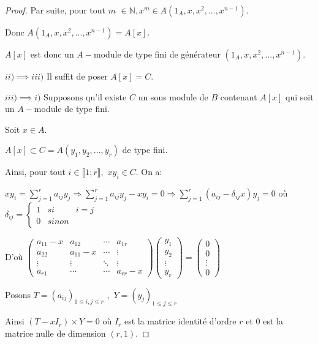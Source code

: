 \begin{proof}
	Par suite, pour tout $m$ $\in \mathbb{N},x^{m}\in A(1_A,x,x^{2},...,x^{n-1}).$
	
	Donc $A(1_A,x,x^{2},...,x^{n-1})=A[x]$.
	
	$A[x]$ est donc un $A-$module de type fini de générateur $
	(1_A,x,x^{2},...,x^{n-1}).$
	
	$ii)\implies iii)$ Il suffit de poser $A[x]=C$.
	
	$iii)\implies i)$ Supposons qu'il existe $C$ un sous module de $B$ contenant $A[x]$ qui soit un $A-$module de type fini.
	
	Soit $x\in A.$
	
	$A[x]\subset C=A(y_{1},y_{2},...,y_{r})$ de type fini.
	
	Ainsi, pour tout $i\in \llbracket 1; r \rrbracket ,$ $xy_{i}\in C.$ On
	a:
	
	$xy_{i}=\sum\limits_{j=1}^{r}a_{ij}y_{j}\Rightarrow
	\sum\limits_{j=1}^{r}a_{ij}y_{j}-xy_{i}=0\Rightarrow
	\sum\limits_{j=1}^{r}(a_{ij}-\delta _{ij}x)y_{j}=0$ où $\delta_{ij}=\left\{ 
	\begin{array}{ccc}
		1 & { si } & i=j \\ 
		0 & { sinon}
	\end{array}
	\right. $
	
	D'où $\left( 
	\begin{array}{cccc}
		a_{11}-x & a_{12} & \cdots & a_{1r} \\ 
		a_{22} & a_{11}-x & \cdots& \vdots\\ 
		\vdots & \vdots& \ddots  & \vdots\\ 
		a_{r1} & \cdots & \cdots & a_{rr}-x
	\end{array}
	\right) \left( 
	\begin{array}{c}
		y_{1} \\ 
		y_{2} \\ 
		\vdots \\ 
		y_{r}
	\end{array}
	\right) =\left( 
	\begin{array}{c}
		0 \\ 
		0 \\ 
		\vdots\\ 
		0
	\end{array}
	\right) $
	
	Posons $T=(a_{ij})_{1\leq i,j\leq r}$ $,$ $Y=(y_{j})_{1\leq j\leq r}$ 
	
	Ainsi $(T-xI_{r})\times Y=0$ où $I_{r}$ est la matrice identité d'ordre $r$ et $0$ est la matrice nulle de dimension $(r,1).$
	

\end{proof}
